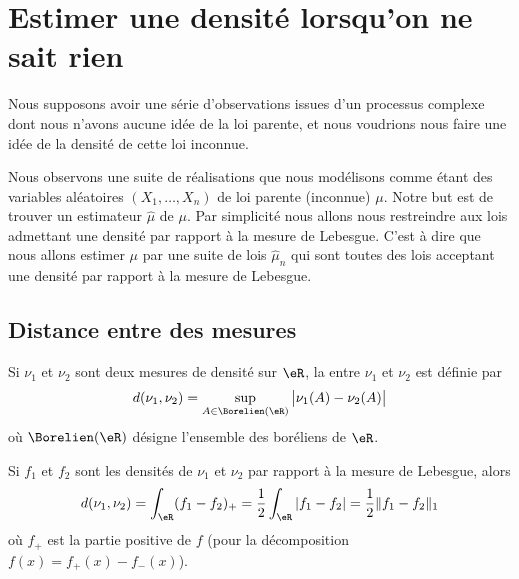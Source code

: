 \section{Estimer une densité lorsqu'on ne sait rien}

Nous supposons avoir une série d'observations issues d'un processus complexe dont nous n'avons aucune idée de la loi parente, et nous voudrions nous faire une idée de la densité de cette loi inconnue.

Nous observons une suite de réalisations que nous modélisons comme étant des variables aléatoires \( (X_1,\ldots, X_n)\) de loi parente (inconnue) \( \mu\). Notre but est de trouver un estimateur \( \hat \mu\) de \( \mu\). Par simplicité nous allons nous restreindre aux lois admettant une densité par rapport à la mesure de Lebesgue. C'est à dire que nous allons estimer \( \mu\) par une suite de lois \( \hat \mu_n\) qui sont toutes des lois acceptant une densité par rapport à la mesure de Lebesgue.

\subsection{Distance entre des mesures}

Si \( \nu_1\) et \( \nu_2\) sont deux mesures de densité sur \( \eR\), la  entre \( \nu_1\) et \( \nu_2\) est définie par
\begin{equation}
    d(\nu_1,\nu_2)=\sup_{A\in\Borelien(\eR)}\big| \nu_1(A)-\nu_2(A) \big|    
\end{equation}
où \( \Borelien(\eR)\) désigne l'ensemble des boréliens de \( \eR\).

\begin{theorem}
    Si \( f_1\) et \( f_2\) sont les densités de \( \nu_1\) et \( \nu_2\) par rapport à la mesure de Lebesgue, alors
    \begin{equation}
        d(\nu_1,\nu_2)=\int_{\eR}(f_1-f_2)_+=\frac{ 1 }{2}\int_{\eR}| f_1-f_2 |=\frac{ 1 }{2}\| f_1-f_2 \|_1
    \end{equation}
    où \( f_+\) est la partie positive de \( f\) (pour la décomposition \( f(x)=f_+(x)-f_-(x)\)).
\end{theorem}

